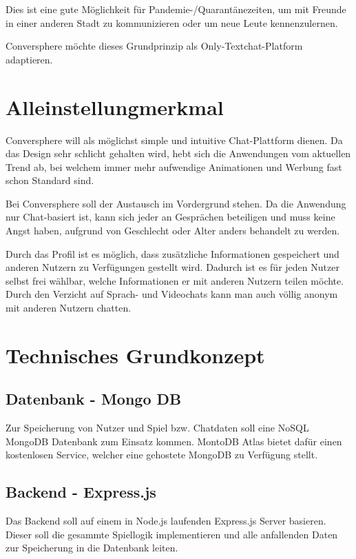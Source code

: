 \documentclass[conference]{IEEEtran}
\begin{document}
	Dies ist eine gute Möglichkeit für Pandemie-/Quarantänezeiten, um mit Freunde in einer anderen Stadt zu kommunizieren oder um neue Leute kennenzulernen.
	
	Conversphere möchte dieses Grundprinzip als Only-Textchat-Platform adaptieren.
	\ \\

	\section{Alleinstellungmerkmal}
	Conversphere will als möglichst simple und intuitive Chat-Plattform dienen. Da das Design sehr schlicht gehalten wird, hebt sich die Anwendungen vom aktuellen Trend ab, bei welchem immer mehr aufwendige Animationen und Werbung fast schon Standard sind.
	
	Bei Conversphere soll der Austausch im Vordergrund stehen. Da die Anwendung nur Chat-basiert ist, kann sich jeder an Gesprächen beteiligen und muss keine Angst haben, aufgrund von Geschlecht oder Alter anders behandelt zu werden.
	
	Durch das Profil ist es möglich, dass zusätzliche Informationen gespeichert und anderen Nutzern zu Verfügungen gestellt wird. Dadurch ist es für jeden Nutzer selbst frei wählbar, welche Informationen er mit anderen Nutzern teilen möchte. Durch den Verzicht auf Sprach- und Videochats kann man auch völlig anonym mit anderen Nutzern chatten.
	\ \\

	\section{Technisches Grundkonzept}
	\subsection{Datenbank - Mongo DB}
	Zur Speicherung von Nutzer und Spiel bzw. Chatdaten soll eine NoSQL MongoDB Datenbank zum Einsatz kommen. MontoDB Atlas bietet dafür einen kostenlosen Service, welcher eine gehostete MongoDB zu Verfügung stellt.

	\subsection{Backend - Express.js}
	Das Backend soll auf einem in Node.js laufenden Express.js Server basieren. Dieser soll die gesammte Spiellogik implementieren und alle anfallenden Daten zur Speicherung in die Datenbank leiten.
\end{document}
